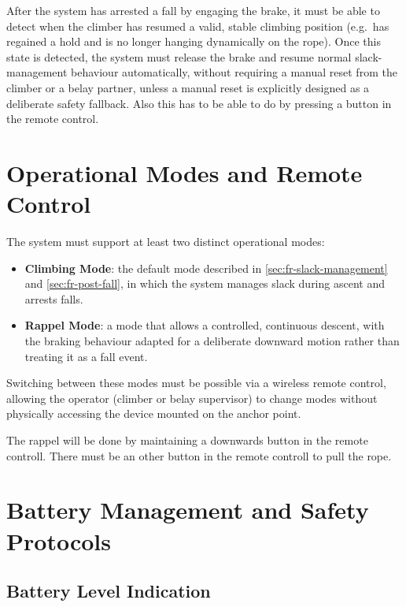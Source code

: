 After the system has arrested a fall by engaging the brake, it must be
able to detect when the climber has resumed a valid, stable climbing
position (e.g.\ has regained a hold and is no longer hanging dynamically
on the rope). Once this state is detected, the system must release the
brake and resume normal slack-management behaviour automatically, without
requiring a manual reset from the climber or a belay partner, unless a
manual reset is explicitly designed as a deliberate safety fallback. Also
this has to be able to do by pressing a button in the remote control.

\section{Operational Modes and Remote Control}
\label{sec:fr-modes}

The system must support at least two distinct operational modes:

\begin{itemize}
    \item \textbf{Climbing Mode}: the default mode described in
        \cref{sec:fr-slack-management} and \cref{sec:fr-post-fall}, in
        which the system manages slack during ascent and arrests falls.
    \item \textbf{Rappel Mode}: a mode that allows a controlled,
        continuous descent, with the braking behaviour adapted for a
        deliberate downward motion rather than treating it as a fall
        event.
\end{itemize}

Switching between these modes must be possible via a wireless remote
control, allowing the operator (climber or belay supervisor) to change
modes without physically accessing the device mounted on the anchor point.

The rappel will be done by maintaining a downwards button in the remote controll.
There must be an other button in the remote controll to pull the rope.

\section{Battery Management and Safety Protocols}
\label{sec:fr-battery}

\subsection{Battery Level Indication}

